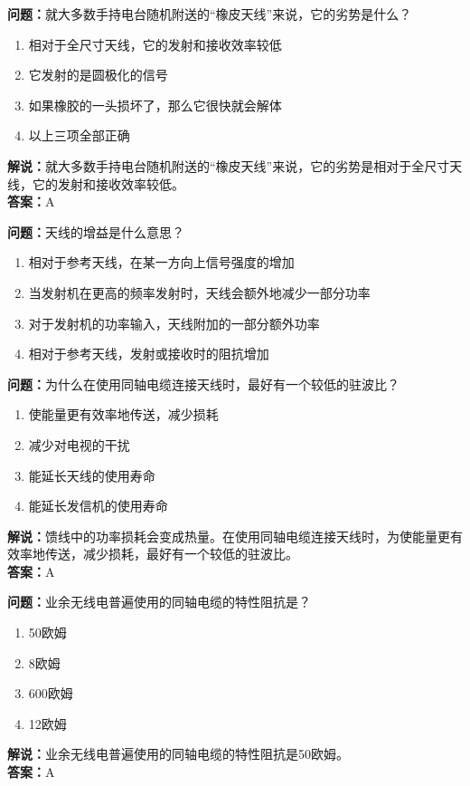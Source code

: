 \documentclass[UTF8]{ctexbook}
\begin{document}
\textbf{问题：}就大多数手持电台随机附送的“橡皮天线”来说，它的劣势是什么？
\begin{enumerate}[label=\Alph*), leftmargin=3em]
  \item 相对于全尺寸天线，它的发射和接收效率较低
  \item 它发射的是圆极化的信号
  \item 如果橡胶的一头损坏了，那么它很快就会解体
  \item 以上三项全部正确
\end{enumerate}
\textbf{解说：}就大多数手持电台随机附送的“橡皮天线”来说，它的劣势是相对于全尺寸天线，它的发射和接收效率较低。\\
\textbf{答案：}A

\textbf{问题：}天线的增益是什么意思？
\begin{enumerate}[label=\Alph*), leftmargin=3em]
  \item 相对于参考天线，在某一方向上信号强度的增加
  \item 当发射机在更高的频率发射时，天线会额外地减少一部分功率
  \item 对于发射机的功率输入，天线附加的一部分额外功率
  \item 相对于参考天线，发射或接收时的阻抗增加
\end{enumerate}

\textbf{问题：}为什么在使用同轴电缆连接天线时，最好有一个较低的驻波比？
\begin{enumerate}[label=\Alph*), leftmargin=3em]
  \item 使能量更有效率地传送，减少损耗
  \item 减少对电视的干扰
  \item 能延长天线的使用寿命
  \item 能延长发信机的使用寿命
\end{enumerate}
\textbf{解说：}馈线中的功率损耗会变成热量。在使用同轴电缆连接天线时，为使能量更有效率地传送，减少损耗，最好有一个较低的驻波比。\\
\textbf{答案：}A

\textbf{问题：}业余无线电普遍使用的同轴电缆的特性阻抗是？
\begin{enumerate}[label=\Alph*), leftmargin=3em]
  \item 50欧姆
  \item 8欧姆
  \item 600欧姆
  \item 12欧姆
\end{enumerate}
\textbf{解说：}业余无线电普遍使用的同轴电缆的特性阻抗是50欧姆。\\
\textbf{答案：}A
\end{document}
